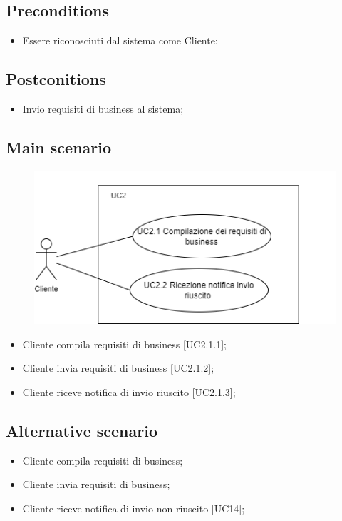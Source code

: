 \documentclass{article}
\begin{document}
     \subsection*{Preconditions} 
     \begin{itemize}
         \item Essere riconosciuti dal sistema come Cliente;
     \end{itemize}
     \subsection*{Postconitions} 
        \begin{itemize}
            \item Invio requisiti di business al sistema;
        \end{itemize}
     \subsection*{Main scenario}
         \begin{figure}[h]
            \centering
            \includegraphics{./imgUML/UC2-zoom.png}
            \label{fig:immagine}
        \end{figure}
        \begin{itemize}
            \item Cliente compila requisiti di business [UC2.1.1];
            \item Cliente invia requisiti di business [UC2.1.2];
            \item Cliente riceve notifica di invio riuscito [UC2.1.3];
        \end{itemize}
     \subsection*{Alternative scenario}
        \begin{itemize}
            \item Cliente compila requisiti di business;
            \item Cliente invia requisiti di business;
            \item Cliente riceve notifica di invio non riuscito [UC14];
        \end{itemize}
\end{document}
